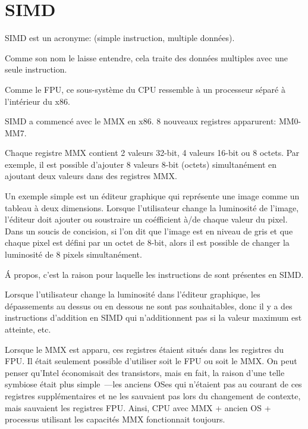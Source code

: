 \section{SIMD}

\label{SIMD_x86}
\ac{SIMD} est un acronyme:  (simple instruction,
multiple données).

Comme son nom le laisse entendre, cela traite des données multiples avec une seule
instruction.

Comme le \ac{FPU}, ce sous-système du \ac{CPU} ressemble à un processeur séparé à
l'intérieur du x86.


SIMD a commencé avec le MMX en x86. 8 nouveaux registres apparurent: MM0-MM7.

Chaque registre MMX contient 2 valeurs 32-bit, 4 valeurs 16-bit ou 8 octets.
Par exemple, il est possible d'ajouter 8 valeurs 8-bit (octets) simultanément en
ajoutant deux valeurs dans des registres MMX.

Un exemple simple est un éditeur graphique qui représente une image comme un tableau
à deux dimensions.
Lorsque l'utilisateur change la luminosité de l'image, l'éditeur doit ajouter ou
soustraire un coéfficient à/de chaque valeur du pixel.
Dans un soucis de concision, si l'on dit que l'image est en niveau de gris et que
chaque pixel est défini par un octet de 8-bit, alors il est possible de changer la
luminosité de 8 pixels simultanément.

Á propos, c'est la raison pour laquelle les instructions de  sont
présentes en SIMD.

Lorsque l'utilisateur change la luminosité dans l'éditeur graphique, les dépassements
au dessus ou en dessous ne sont pas souhaitables, donc il y a des instructions d'addition
en SIMD qui n'additionnent pas si la valeur maximum est atteinte, etc.

Lorsque le MMX est apparu, ces registres étaient situés dans les registres du FPU.
Il était seulement possible d'utiliser soit le FPU ou soit le MMX. On peut penser
qu'Intel économisait des transistors, mais en fait, la raison d'une telle symbiose
était plus simple~---les anciens \ac{OS}es qui n'étaient pas au courant de ces registres
supplémentaires et ne les sauvaient pas lors du changement de contexte, mais sauvaient
les registres FPU.
Ainsi, CPU avec MMX + ancien \ac{OS} + processus utilisant les capacités MMX fonctionnait
toujours.

